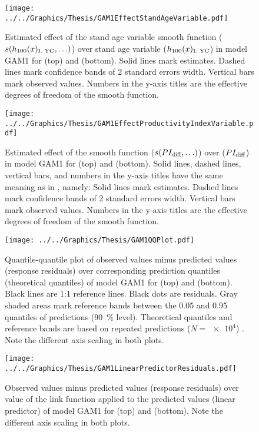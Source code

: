 \begin{figure}[h]
  \centering
  \texttt{[image: ../../Graphics/Thesis/GAM1EffectStandAgeVariable.pdf]}
  \caption{Estimated effect of the stand age variable smooth function (\(s(h_{100}(x)_{\text{I. YC}}{}, \ldots)\)) over stand age variable (\(h_{100}(x)_{\text{I. YC}}{}\)) in model GAM1 for \Beech{} (top) and \Spruce{} (bottom).  Solid lines mark estimates.  Dashed lines mark confidence bands of 2 standard errors width.  Vertical bars mark observed values.  Numbers in the y-axis titles are the effective degrees of freedom of the smooth function.}
  \label{fig:GAM1EffectStandAgeVariable}
\end{figure}

\begin{figure}[h]
  \centering
  \texttt{[image: ../../Graphics/Thesis/GAM1EffectProductivityIndexVariable.pdf]}
  \caption{Estimated effect of the \ProductivityIndexVariableText{} smooth function (\(s(PI_{\text{diff}}{}, \ldots)\)) over \ProductivityIndexVariableText{} (\(PI_{\text{diff}}{}\)) in model GAM1 for \Beech{} (top) and \Spruce{} (bottom).  Solid lines, dashed lines, vertical bars, and numbers in the y-axis titles have the same meaning as in , namely:  Solid lines mark estimates.  Dashed lines mark confidence bands of 2 standard errors width.  Vertical bars mark observed values.  Numbers in the y-axis titles are the effective degrees of freedom of the smooth function.}
  \label{fig:GAM1EffectProductivityIndexVariable}
\end{figure}

\begin{figure}[h]
  \centering
  \texttt{[image: ../../Graphics/Thesis/GAM1QQPlot.pdf]}
  \caption{Quantile-quantile plot of observed values minus predicted values (response residuals) over corresponding prediction quantiles (theoretical quantiles) of model GAM1 for \Beech{} (top) and \Spruce{} (bottom).  Black lines are 1:1 reference lines.  Black dots are residuals.  Gray shaded areas mark reference bands between the \num{0.05} and \num{0.95} quantiles of predictions (\SI{90}{\percent} level).  Theoretical quantiles and reference bands are based on repeated predictions (\(N = \num{e4}\)) \parencite{Augustin2012}.  Note the different axis scaling in both plots.}
  \label{fig:GAM1QQPlot}
\end{figure}

\begin{figure}[h]
  \centering
  \texttt{[image: ../../Graphics/Thesis/GAM1LinearPredictorResiduals.pdf]}
  \caption{Observed values minus predicted values (response residuals) over value of the link function applied to the predicted values (linear predictor) of model GAM1 for \Beech{} (top) and \Spruce{} (bottom).  Note the different axis scaling in both plots.}
  \label{fig:GAM1LinearPredictorResiduals}
\end{figure}

